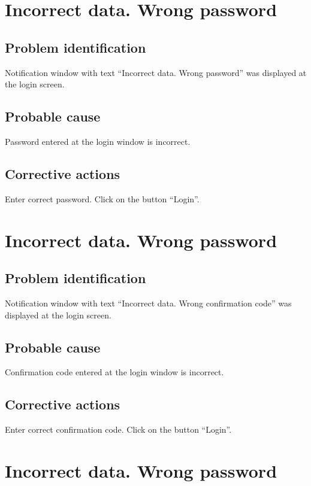 \section{Incorrect data. Wrong password}

\subsection{Problem identification}
Notification window with text ``Incorrect data. Wrong password''
was displayed at the login screen.

\subsection{Probable cause}
Password entered at the login window is incorrect.

\subsection{Corrective actions}
Enter correct password. Click on the button ``Login''.


\section{Incorrect data. Wrong password}

\subsection{Problem identification}
Notification window with text ``Incorrect data. Wrong confirmation code''
was displayed at the login screen.

\subsection{Probable cause}
Confirmation code entered at the login window is incorrect.

\subsection{Corrective actions}
Enter correct confirmation code. Click on the button ``Login''.


\section{Incorrect data. Wrong password}

